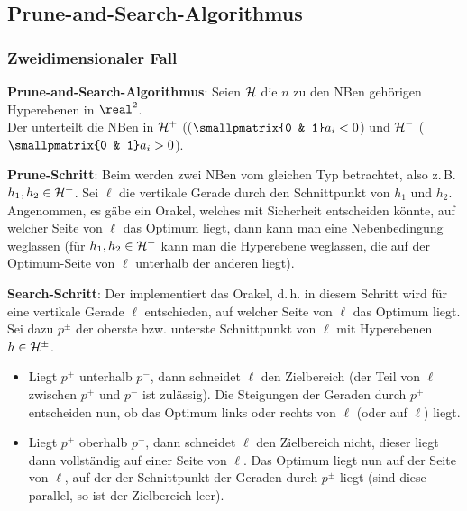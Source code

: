 \pagebreak

\subsection{%
    Prune-and-Search-Algorithmus%
}

\subsubsection{%
    Zweidimensionaler Fall%
}

\textbf{Prune-and-Search-Algorithmus}:
Seien $\mathcal{H}$ die $n$ zu den NBen gehörigen Hyperebenen in $\real^2$.\\
Der  unterteilt die NBen in
 $\mathcal{H}^+$ (($\smallpmatrix{0 & 1} a_i < 0$) und
 $\mathcal{H}^-$ ($\smallpmatrix{0 & 1} a_i > 0$).

\textbf{Prune-Schritt}:
Beim  werden zwei NBen vom gleichen Typ betrachtet,
also z.\,B. $h_1, h_2 \in \mathcal{H}^+$.
Sei $\ell$ die vertikale Gerade durch den Schnittpunkt von $h_1$ und $h_2$.
Angenommen, es gäbe ein Orakel, welches mit Sicherheit entscheiden könnte, auf welcher Seite
von $\ell$ das Optimum liegt, dann kann man eine Nebenbedingung weglassen
(für $h_1, h_2 \in \mathcal{H}^+$ kann man die Hyperebene weglassen, die auf der Optimum-Seite von $\ell$
unterhalb der anderen liegt).

\textbf{Search-Schritt}:
Der  implementiert das Orakel,
d.\,h. in diesem Schritt wird für eine vertikale Gerade $\ell$ entschieden,
auf welcher Seite von $\ell$ das Optimum liegt.\\
Sei dazu $p^\pm$ der oberste bzw. unterste Schnittpunkt von $\ell$ mit Hyperebenen $h \in \mathcal{H}^\pm$.
\begin{itemize}
    \item
    Liegt $p^+$ unterhalb $p^-$, dann schneidet $\ell$ den Zielbereich
    (der Teil von $\ell$ zwischen $p^+$ und $p^-$ ist zulässig).
    Die Steigungen der Geraden durch $p^+$ entscheiden nun, ob das Optimum links oder
    rechts von $\ell$ (oder auf $\ell$) liegt.

    \item
    Liegt $p^+$ oberhalb $p^-$, dann schneidet $\ell$ den Zielbereich nicht, dieser liegt dann
    vollständig auf einer Seite von $\ell$.
    Das Optimum liegt nun auf der Seite von $\ell$, auf der der Schnittpunkt der Geraden durch
    $p^\pm$ liegt
    (sind diese parallel, so ist der Zielbereich leer).
\end{itemize}

